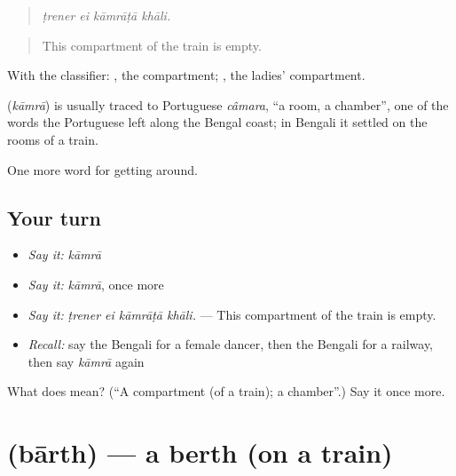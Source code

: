 \begin{quote}
   
\end{quote}

\begin{quote}
\emph{ṭrener ei kāmrāṭā khāli.}
\end{quote}

\begin{quote}
This compartment of the train is empty.
\end{quote}

With the classifier: , the compartment;  , the ladies' compartment.

\begin{cousinweb}
\textbf{} (\emph{kāmrā}) is usually traced to Portuguese \emph{câmara}, \textquotedblleft{}a room, a chamber\textquotedblright{}, one of the words the Portuguese left along the Bengal coast; in Bengali it settled on the rooms of a train.
\end{cousinweb}

\begin{grammarlens}[title={What you've built}]
One more word for getting around.
\end{grammarlens}

\subsection*{Your turn}
\begin{itemize}
\raggedright
  \item \emph{Say it:} \emph{kāmrā}
  \item \emph{Say it:} \emph{kāmrā}, once more
  \item \emph{Say it:} \emph{ṭrener ei kāmrāṭā khāli.} — This compartment of the train is empty.
  \item \emph{Recall:} say the Bengali for a female dancer, then the Bengali for a railway, then say \emph{kāmrā} again
\end{itemize}

\begin{tcolorbox}[breakable,colback=teal!4,colframe=teal!35!black,title={Before you move on}]
What does  mean? (\textquotedblleft{}A compartment (of a train); a chamber\textquotedblright{}.) Say it once more.
\end{tcolorbox}
\section[\texorpdfstring{\bn{বার্থ} (bārth)}{বার্থ (bārth)}]{ (bārth) — a berth (on a train)}

